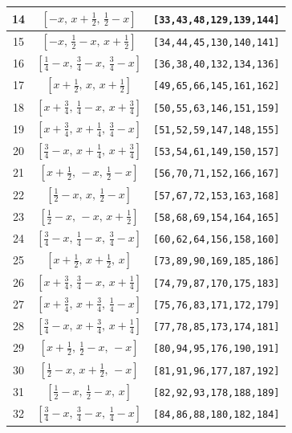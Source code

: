 \documentclass[fleqn,8pt]{jsarticle}
\begin{document}
\begin{longtable}{ccc}
14 & $\left[ - x,\, x + \frac{1}{2},\, \frac{1}{2} - x \right]$ & {\tt [33,43,48,129,139,144]} \\ \hline
15 & $\left[ - x,\, \frac{1}{2} - x,\, x + \frac{1}{2} \right]$ & {\tt [34,44,45,130,140,141]} \\ \hline
16 & $\left[ \frac{1}{4} - x,\, \frac{3}{4} - x,\, \frac{3}{4} - x \right]$ & {\tt [36,38,40,132,134,136]} \\ \hline
17 & $\left[ x + \frac{1}{2},\, x,\, x + \frac{1}{2} \right]$ & {\tt [49,65,66,145,161,162]} \\ \hline
18 & $\left[ x + \frac{3}{4},\, \frac{1}{4} - x,\, x + \frac{3}{4} \right]$ & {\tt [50,55,63,146,151,159]} \\ \hline
19 & $\left[ x + \frac{3}{4},\, x + \frac{1}{4},\, \frac{3}{4} - x \right]$ & {\tt [51,52,59,147,148,155]} \\ \hline
20 & $\left[ \frac{3}{4} - x,\, x + \frac{1}{4},\, x + \frac{3}{4} \right]$ & {\tt [53,54,61,149,150,157]} \\ \hline
21 & $\left[ x + \frac{1}{2},\, - x,\, \frac{1}{2} - x \right]$ & {\tt [56,70,71,152,166,167]} \\ \hline
22 & $\left[ \frac{1}{2} - x,\, x,\, \frac{1}{2} - x \right]$ & {\tt [57,67,72,153,163,168]} \\ \hline
23 & $\left[ \frac{1}{2} - x,\, - x,\, x + \frac{1}{2} \right]$ & {\tt [58,68,69,154,164,165]} \\ \hline
24 & $\left[ \frac{3}{4} - x,\, \frac{1}{4} - x,\, \frac{3}{4} - x \right]$ & {\tt [60,62,64,156,158,160]} \\ \hline
25 & $\left[ x + \frac{1}{2},\, x + \frac{1}{2},\, x \right]$ & {\tt [73,89,90,169,185,186]} \\ \hline
26 & $\left[ x + \frac{3}{4},\, \frac{3}{4} - x,\, x + \frac{1}{4} \right]$ & {\tt [74,79,87,170,175,183]} \\ \hline
27 & $\left[ x + \frac{3}{4},\, x + \frac{3}{4},\, \frac{1}{4} - x \right]$ & {\tt [75,76,83,171,172,179]} \\ \hline
28 & $\left[ \frac{3}{4} - x,\, x + \frac{3}{4},\, x + \frac{1}{4} \right]$ & {\tt [77,78,85,173,174,181]} \\ \hline
29 & $\left[ x + \frac{1}{2},\, \frac{1}{2} - x,\, - x \right]$ & {\tt [80,94,95,176,190,191]} \\ \hline
30 & $\left[ \frac{1}{2} - x,\, x + \frac{1}{2},\, - x \right]$ & {\tt [81,91,96,177,187,192]} \\ \hline
31 & $\left[ \frac{1}{2} - x,\, \frac{1}{2} - x,\, x \right]$ & {\tt [82,92,93,178,188,189]} \\ \hline
32 & $\left[ \frac{3}{4} - x,\, \frac{3}{4} - x,\, \frac{1}{4} - x \right]$ & {\tt [84,86,88,180,182,184]} \\
\end{longtable}
\end{document}

